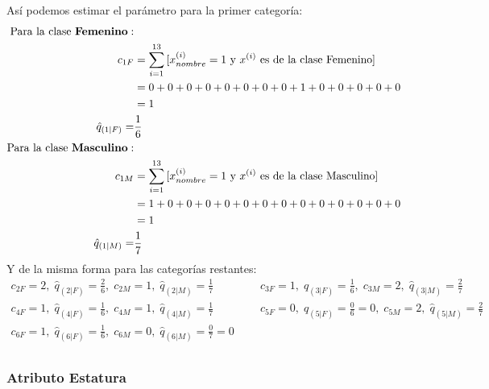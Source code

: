 \documentclass[12pt]{article}
\begin{document}
  Así podemos estimar el parámetro para la primer categoría:\\
  \begin{equation}
  \begin{split}
  	\text{Para la clase \textbf{Femenino}}:\\
  	c_{1F} &= \sum_{i = 1}^{13}{[x^{(i)}_{nombre}=1 \text{ y $x^{(i)}$ es de la clase Femenino}]}\\
  	&= 0 + 0 + 0 + 0 + 0 + 0 + 0 + 0 + 1 + 0 + 0 + 0 + 0 + 0\\
  	&= 1\\
  \hat{q}_{(1|F)} =& \frac{1}{6} \\ 
  \text{Para la clase \textbf{Masculino}}:\\
  c_{1M} &= \sum_{i = 1}^{13}{[x^{(i)}_{nombre}=1 \text{ y $x^{(i)}$ es de la clase Masculino}]}\\
  &= 1 + 0 + 0 + 0 + 0 + 0 + 0 + 0 + 0 + 0 + 0 + 0 + 0 + 0\\
  &= 1\\
  \hat{q}_{(1|M)} =& \frac{1}{7} \\
  \end{split}
  \end{equation}
  Y de la misma forma para las categorías restantes:
  \begin{equation}
  \begin{split}
  c_{2F} = 2, \; \hat{q}_{(2|F)} = \frac{2}{6}, \; c_{2M} = 1, \; \hat{q}_{(2|M)} = \frac{1}{7} \; \; \; \; \; \; \; \; \; \; \; \; &  c_{3F} = 1, \; \hat{q}_{(3|F)} = \frac{1}{6}, \; c_{3M} = 2, \; \hat{q}_{(3|M)} = \frac{2}{7}\\
  c_{4F} = 1, \; \hat{q}_{(4|F)} = \frac{1}{6}, \; c_{4M} = 1, \; \hat{q}_{(4|M)} = \frac{1}{7} \; \; \; \; \; \; \; \; \; \; \; \; &  c_{5F} = 0, \; \hat{q}_{(5|F)} = \frac{0}{6} = 0, \; c_{5M} = 2, \; \hat{q}_{(5|M)} = \frac{2}{7}\\ 
  c_{6F} = 1, \; \hat{q}_{(6|F)} = \frac{1}{6}, \;c_{6M} = 0, \; \hat{q}_{(6|M)} = \frac{0}{7} = 0\\
  \end{split}
  \end{equation}
  \subsubsection{Atributo Estatura}
\end{document}
